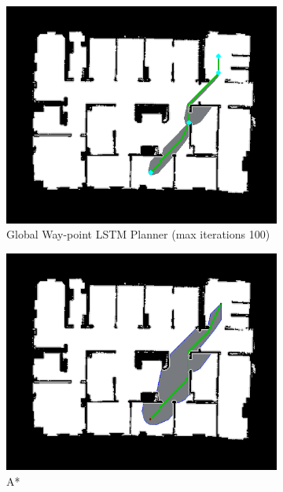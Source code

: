 \begin{figure}[]
\begin{subfigure}[b]{0.40\linewidth}
    \includegraphics[width=\linewidth]{images/screenshot_149.png}
     \caption{Global Way-point LSTM Planner (max iterations 100)}
  \end{subfigure}
  \hfill
  \begin{subfigure}[b]{0.40\linewidth}
    \includegraphics[width=\linewidth]{images/screenshot_126.png}
     \caption{A*\newline}
  \end{subfigure}
  \hfill
  \begin{subfigure}[b]{0.40\linewidth}

\end{subfigure}
\end{figure}
